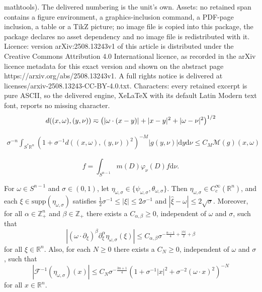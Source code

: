 \documentclass[10pt,a4paper]{amsart}
\newcommand {\F}{\mathcal{F}}
\newcommand {\Ma}{\mathcal{M}}
\newcommand {\Rn}{\mathbb{R}^{n}}
\newcommand {\Sp}{S^{*}\Rn}
\newcommand {\Z}{\mathbb Z}
\newcommand {\ph}{\varphi}
\newcommand {\supp}{\mathrm{supp}}
\newcommand {\ud}{\mathrm{d}}
\newcommand {\w}{\omega}
\begin{document}
mathtools). The delivered numbering is the unit's own. Assets: no retained span contains a figure environment, a graphics-inclusion command, a PDF-page inclusion, a table or a TikZ picture; no image file is copied into this package, the package declares no asset dependency and no image file is redistributed with it. Licence: version arXiv:2508.13243v1 of this article is distributed under the Creative Commons Attribution 4.0 International licence, as recorded in the arXiv licence metadata for this exact version and shown on the abstract page https://arxiv.org/abs/2508.13243v1. A full rights notice is delivered at licenses/arxiv-2508.13243-CC-BY-4.0.txt. Characters: every retained excerpt is pure ASCII, so the delivered engine, XeLaTeX with its default Latin Modern text font, reports no missing character.
\begin{equation}\label{eq:equivmetric}
d((x,\omega),(y,\nu))\eqsim \big{(}|\omega\cdot(x-y)|+|x-y|^{2}+|\omega-\nu|^{2}\big{)}^{1/2}
\end{equation}

\begin{align}\label{eq:HLcontrol}
{\sigma}^{-n}\int_{\Sp}(1+{\sigma}^{-1}d((x,\omega),(y,\nu))^{2})^{-M}
|g(y,\nu)|\ud y\ud\nu
\leq C_{M}\Ma(g)(x,\omega)
\end{align}

\begin{equation}\label{eq:phiproperties3}
f=\int_{S^{n-1}}m(D)\ph_{\nu}(D)f\ud\nu.
\end{equation}

\begin{lemma}\label{lem:packetbounds}
For $\w\in S^{n-1}$ and $\sigma\in(0,1)$, let $\eta_{\w,\sigma}\in\{\psi_{\w,\sigma},\theta_{\w,\sigma}\}$. Then $\eta_{\w,\sigma}\in C^{\infty}_{c}(\Rn)$, and each $\xi\in\supp(\eta_{\w,\sigma})$ satisfies $\frac{1}{2}\sigma^{-1}\leq |\xi|\leq 2\sigma^{-1}$ and $|\hat{\xi}-\w|\leq 2\sqrt{\sigma}$. 
Moreover, for all $\alpha\in\Z_{+}^{n}$ and $\beta\in\Z_{+}$ there exists a $C_{\alpha,\beta}\geq0$, independent of $\w$ and $\sigma$, such that
\begin{equation}\label{eq:boundspsi}
|(\w\cdot\partial_{\xi})^{\beta}\partial_{\xi}^{\alpha}\eta_{\w,\sigma}(\xi)|\leq C_{\alpha,\beta}\sigma^{-\frac{n-1}{4}+\frac{|\alpha|}{2}+\beta}
\end{equation}
for all $\xi\in\Rn$. Also, for each $N\geq0$ there exists a $C_{N}\geq0$, independent of $\w$ and $\sigma$, such that
\begin{equation}\label{eq:boundspsiinverse}
|\F^{-1}(\eta_{\w,\sigma})(x)|\leq C_{N}\sigma^{-\frac{3n+1}{4}}(1+\sigma^{-1}|x|^{2}+\sigma^{-2}(\w\cdot x)^{2})^{-N}
\end{equation}
for all $x\in\Rn$.
\end{lemma}
\end{document}
